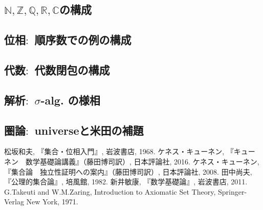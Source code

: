 \documentclass[a4paper]{bxjsarticle}
\newcommand{\nat}{\mathbb{N}}
\newcommand{\zah}{\mathbb{Z}}
\newcommand{\quo}{\mathbb{Q}}
\newcommand{\rea}{\mathbb{R}}
\newcommand{\com}{\mathbb{C}}
\theoremstyle{definition}
\begin{document}
    \subsection{$\nat, \zah, \quo, \rea, \com$の構成}
    
    \subsection{位相$\colon$ 順序数での例の構成}
    
    \subsection{代数$\colon$ 代数閉包の構成}
    
    \subsection{解析$\colon$ $\sigma$-alg. の様相}
    
    \subsection{圏論$\colon$ universeと米田の補題}

    \newpage
    
    \begin{thebibliography}{9}
         松坂和夫, 『集合・位相入門』, 岩波書店, 1968.
         ケネス・キューネン, 『キューネン　数学基礎論講義』（藤田博司訳）, 日本評論社, 2016.
         ケネス・キューネン, 『集合論　独立性証明への案内』（藤田博司訳）, 日本評論社, 2008.
         田中尚夫, 『公理的集合論』, 培風館, 1982.
         新井敏康, 『数学基礎論』, 岩波書店, 2011.
         G.Takeuti and W.M.Zaring, Introduction to Axiomatic Set Theory, Springer-Verlag New York, 1971.
        
    \end{thebibliography}
\end{document}

